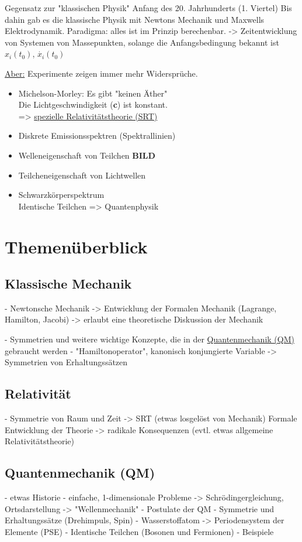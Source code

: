 Gegensatz zur "klassischen Physik"
Anfang des 20. Jahrhunderts (1. Viertel)
Bis dahin gab es die klassische Physik mit Newtons Mechanik und Maxwells Elektrodynamik.
Paradigma: alles ist im Prinzip berechenbar.
-> Zeitentwicklung von Systemen von Massepunkten, solange die Anfangsbedingung bekannt ist
$x_{i}(t_{0})$, $\dot{x_{i}}(t_{0})$

\underline{Aber:} Experimente zeigen immer mehr Widerspr\"uche.
\begin{itemize}
  \item Michelson-Morley: Es gibt "keinen \"Ather"\\
        Die Lichtgeschwindigkeit (\textbf{c}) ist konstant.\\
        => \underline{spezielle Relativit\"atstheorie (SRT)}
  \item Diskrete Emissionsspektren (Spektrallinien)
  \item Welleneigenschaft von Teilchen \textbf{BILD}
  \item Teilcheneigenschaft von Lichtwellen
  \item Schwarzk\"orperspektrum\\
        Identische Teilchen
        => Quantenphysik
\end{itemize}

\section{Themen\"uberblick}
\subsection{Klassische Mechanik}
- Newtonsche Mechanik
-> Entwicklung der Formalen Mechanik (Lagrange, Hamilton, Jacobi)
-> erlaubt eine theoretische Diskussion der Mechanik

- Symmetrien und weitere wichtige Konzepte, die in der \underline{Quantenmechanik (QM)} gebraucht werden
- "Hamiltonoperator", kanonisch konjungierte Variable
-> Symmetrien von Erhaltungss\"atzen

\subsection{Relativit\"at}
- Symmetrie von Raum und Zeit
-> SRT (etwas losgel\"ost von Mechanik)
Formale Entwicklung der Theorie
-> radikale Konsequenzen
(evtl. etwas allgemeine Relativit\"atstheorie)

\subsection{Quantenmechanik (QM)}
- etwas Historie
- einfache, 1-dimensionale Probleme
-> Schr\"odingergleichung, Ortsdarstellung
-> "Wellenmechanik"
- Postulate der QM
- Symmetrie und Erhaltungss\"atze (Drehimpuls, Spin)
- Wasserstoffatom
-> Periodensystem der Elemente (PSE)
- Identische Teilchen (Bosonen und Fermionen)
- Beispiele